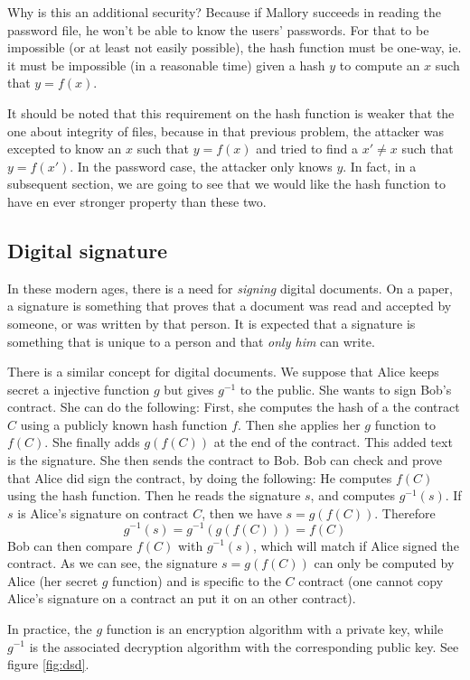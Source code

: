 \documentclass[12pt,a4paper]{article}
\begin{document}
Why is this an additional security? Because if Mallory succeeds in reading the password file, he won't be able to know the users' passwords. For that to be impossible (or at least not easily possible), the hash function must be one-way, ie. it must be impossible (in a reasonable time)  given a hash $y$ to compute an $x$ such that $y=f(x)$.

It should be noted that this requirement on the hash function is weaker that the one about integrity of files, because in that previous problem, the attacker was excepted to know an $x$ such that $y=f(x)$ and tried to find a $x'\neq x$ such that $y=f(x')$. In the password case, the attacker only knows $y$. In fact, in a subsequent section, we are going to see that we would like the hash function to have en ever stronger property than these two.

\subsection{Digital signature}
In these modern ages, there is a need for {\em signing} digital documents. On a paper, a signature is something that proves that a document was read and accepted by someone, or was written by that person. It is expected that a signature is something that is unique to a person and that {\em only him} can write.

There is a similar concept for digital documents. We suppose that Alice keeps secret a injective function $g$ but gives $g^{-1}$ to the public. She wants to sign Bob's contract. She can do the following: First, she computes the hash of a the contract $C$ using a publicly known hash function $f$. Then she applies her $g$ function to $f(C)$. She finally adds $g(f(C))$ at the end of the contract. This added text is the signature. She then sends the contract to Bob. Bob can check and prove that Alice did sign the contract, by doing the following: He computes $f(C)$ using the hash function. Then he reads the signature $s$, and computes $g^{-1}(s)$. If $s$ is Alice's signature on contract $C$, then we have $s=g(f(C))$. Therefore
\[ g^{-1}(s) = g^{-1}(g(f(C))) = f(C) \]
Bob can then compare $f(C)$ with $g^{-1}(s)$, which will match if Alice signed the contract. As we can see, the signature $s=g(f(C))$ can only be computed by Alice (her secret $g$ function) and is specific to the $C$ contract (one cannot copy Alice's signature on a contract an put it on an other contract).

In practice, the $g$ function is an encryption algorithm with a private key, while $g^{-1}$ is the associated decryption algorithm with the corresponding public key. See figure \ref{fig:dsd}.
\end{document}

